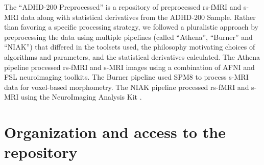 \documentclass[preprint,12pt,3p]{elsarticle}
\begin{document}
The ``ADHD-200 Preprocessed'' is a repository of preprocessed rs-fMRI and s-MRI data along with statistical derivatives from the ADHD-200 Sample. Rather than favoring a specific processing strategy, we followed a pluralistic approach by preprocessing the data using multiple pipelines (called ``Athena'', ``Burner'' and ``NIAK'') that differed in the toolsets used, the philosophy motivating choices of algorithms and parameters, and the statistical derivatives calculated. The Athena pipeline processed rs-fMRI and s-MRI images using a combination of AFNI \cite{cox1996afni} and FSL \cite{smith2004advances} neuroimaging toolkits. The Burner pipeline used SPM8 \cite{ashburner2012spm8} to process s-MRI data for voxel-based morphometry. The NIAK pipeline processed rs-fMRI and s-MRI using the NeuroImaging Analysis Kit \cite{Bellec2011}. 



\section{Organization and access to the repository}
\end{document}
